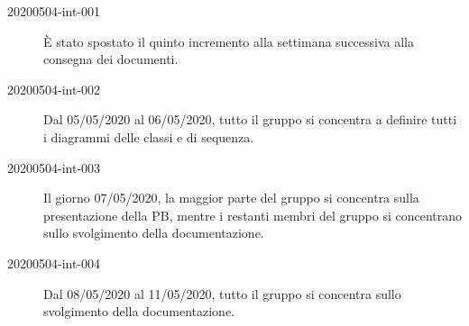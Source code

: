 \documentclass{article}
\begin{document}
\begin{description}
  \item[20200504-int-001] È stato spostato il quinto incremento alla settimana successiva alla consegna dei documenti.
  \item[20200504-int-002] Dal 05/05/2020 al 06/05/2020, tutto il gruppo si concentra a definire tutti i diagrammi delle classi e di sequenza.
  \item[20200504-int-003] Il giorno 07/05/2020, la maggior parte del gruppo si concentra sulla presentazione della PB, mentre i restanti membri del gruppo si concentrano sullo svolgimento della documentazione.
  \item[20200504-int-004] Dal 08/05/2020 al 11/05/2020, tutto il gruppo si concentra sullo svolgimento della documentazione.
\end{description}

\end{document}
